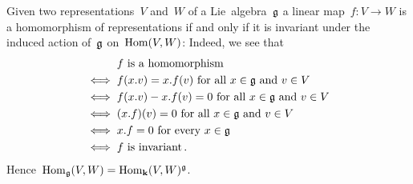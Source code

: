 \begin{remark}
  \label{homomorphisms of representations as invariants}
  Given two representations~$V$ and~$W$ of a Lie~algebra~$\mathfrak{g}$ a linear map~$f \colon V \to W$ is a homomorphism of representations if and only if it is invariant under the induced action of~$\mathfrak{g}$ on~$\operatorname{Hom}(V,W)$:
  Indeed, we see that
  \begin{align*}
        {}& \text{$f$ is a homomorphism}  \\
    \iff{}& \text{$f(x.v) = x.f(v)$ for all~$x \in \mathfrak{g}$ and~$v \in V$}  \\
    \iff{}& \text{$f(x.v) - x.f(v) = 0$ for all~$x \in \mathfrak{g}$ and~$v \in V$}  \\
    \iff{}& \text{$(x.f)(v) = 0$ for all~$x \in \mathfrak{g}$ and~$v \in V$} \\
    \iff{}& \text{$x.f = 0$ for every~$x \in \mathfrak{g}$}  \\
    \iff{}& \text{$f$ is invariant} \,.
  \end{align*}
  Hence~$\operatorname{Hom}_{\mathfrak{g}}(V,W) = \operatorname{Hom}_{\mathbf{k}}(V,W)^{\mathfrak{g}}$.
\end{remark}


